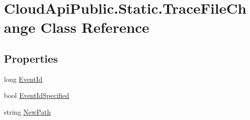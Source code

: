 \hypertarget{class_cloud_api_public_1_1_static_1_1_trace_file_change}{\section{Cloud\-Api\-Public.\-Static.\-Trace\-File\-Change Class Reference}
\label{class_cloud_api_public_1_1_static_1_1_trace_file_change}
}


 


\subsection*{Properties}
\begin{DoxyCompactItemize}
\item 
\hypertarget{class_cloud_api_public_1_1_static_1_1_trace_file_change_a93feec5bf0c690bbf9a73183965d46f5}{long \hyperlink{class_cloud_api_public_1_1_static_1_1_trace_file_change_a93feec5bf0c690bbf9a73183965d46f5}{Event\-Id}}\label{class_cloud_api_public_1_1_static_1_1_trace_file_change_a93feec5bf0c690bbf9a73183965d46f5}

\begin{DoxyCompactList}\small\item\em \end{DoxyCompactList}\item 
\hypertarget{class_cloud_api_public_1_1_static_1_1_trace_file_change_a0e95ad5eecc390c2406a3a298c51272a}{bool \hyperlink{class_cloud_api_public_1_1_static_1_1_trace_file_change_a0e95ad5eecc390c2406a3a298c51272a}{Event\-Id\-Specified}}\label{class_cloud_api_public_1_1_static_1_1_trace_file_change_a0e95ad5eecc390c2406a3a298c51272a}

\begin{DoxyCompactList}\small\item\em \end{DoxyCompactList}\item 
\hypertarget{class_cloud_api_public_1_1_static_1_1_trace_file_change_a895cff12ab5c926e56bfd4e6d9ba7241}{string \hyperlink{class_cloud_api_public_1_1_static_1_1_trace_file_change_a895cff12ab5c926e56bfd4e6d9ba7241}{New\-Path}}\label{class_cloud_api_public_1_1_static_1_1_trace_file_change_a895cff12ab5c926e56bfd4e6d9ba7241}


\end{DoxyCompactItemize}
